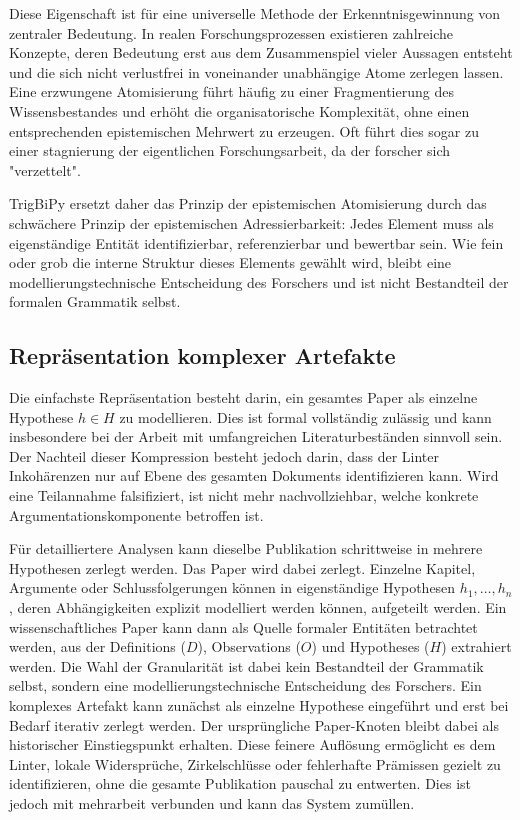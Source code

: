 \documentclass[11pt, a4paper]{article}
\begin{document}
	Diese Eigenschaft ist für eine universelle Methode der Erkenntnisgewinnung von zentraler Bedeutung. In realen Forschungsprozessen existieren zahlreiche Konzepte, deren Bedeutung erst aus dem Zusammenspiel vieler Aussagen entsteht und die sich nicht verlustfrei in voneinander unabhängige Atome zerlegen lassen. Eine erzwungene Atomisierung führt häufig zu einer Fragmentierung des Wissensbestandes und erhöht die organisatorische Komplexität, ohne einen entsprechenden epistemischen Mehrwert zu erzeugen. Oft führt dies sogar zu einer stagnierung der eigentlichen Forschungsarbeit, da der forscher sich "verzettelt".
	
	TrigBiPy ersetzt daher das Prinzip der epistemischen Atomisierung durch das schwächere Prinzip der epistemischen Adressierbarkeit: Jedes Element muss als eigenständige Entität identifizierbar, referenzierbar und bewertbar sein. Wie fein oder grob die interne Struktur dieses Elements gewählt wird, bleibt eine modellierungstechnische Entscheidung des Forschers und ist nicht Bestandteil der formalen Grammatik selbst.
	
	\subsection{Repräsentation komplexer Artefakte}
	Die einfachste Repräsentation besteht darin, ein gesamtes Paper als einzelne Hypothese $h \in H$ zu modellieren. Dies ist formal vollständig zulässig und kann insbesondere bei der Arbeit mit umfangreichen Literaturbeständen sinnvoll sein. Der Nachteil dieser Kompression besteht jedoch darin, dass der Linter Inkohärenzen nur auf Ebene des gesamten Dokuments identifizieren kann. Wird eine Teilannahme falsifiziert, ist nicht mehr nachvollziehbar, welche konkrete Argumentationskomponente betroffen ist.
	
	Für detailliertere Analysen kann dieselbe Publikation schrittweise in mehrere Hypothesen zerlegt werden. Das Paper wird dabei zerlegt. Einzelne Kapitel, Argumente oder Schlussfolgerungen können in eigenständige Hypothesen $h_1,\dots,h_n$, deren Abhängigkeiten explizit modelliert werden können, aufgeteilt werden. Ein wissenschaftliches Paper kann dann als Quelle formaler Entitäten betrachtet werden, aus der Definitions ($D$), Observations ($O$) und Hypotheses ($H$) extrahiert werden. Die Wahl der Granularität ist dabei kein Bestandteil der Grammatik selbst, sondern eine modellierungstechnische Entscheidung des Forschers. Ein komplexes Artefakt kann zunächst als einzelne Hypothese eingeführt und erst bei Bedarf iterativ zerlegt werden. Der ursprüngliche Paper-Knoten bleibt dabei als historischer Einstiegspunkt erhalten. Diese feinere Auflösung ermöglicht es dem Linter, lokale Widersprüche, Zirkelschlüsse oder fehlerhafte Prämissen gezielt zu identifizieren, ohne die gesamte Publikation pauschal zu entwerten. Dies ist jedoch mit mehrarbeit verbunden und kann das System zumüllen.
	
\end{document}

